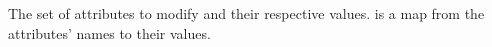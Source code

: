 The set of attributes to modify and their respective values.   is a
map from the attributes' names to their values.
